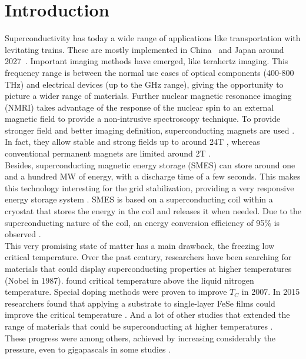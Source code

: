 \documentclass[../main.tex]{subfile}
\begin{document}
\section{Introduction}

Superconductivity has today a wide range of applications like transportation with levitating trains. These are mostly implemented in China~\cite{Roque2024} and Japan around 2027~\cite{Nishijima2013}.
Important imaging methods have emerged, like terahertz imaging. This frequency range is between the normal use cases of 
optical components (400-800 THz) and electrical devices (up to the GHz range), giving the opportunity to picture a wider range of materials.
Further nuclear magnetic resonance imaging (NMRI) takes advantage of the response of the nuclear spin to an external 
magnetic field to provide a non-intrusive spectroscopy technique. To provide stronger field and better imaging definition, superconducting magnets are used \cite{Nakamura2015}. In fact, they
allow stable and strong fields up to around 24T \cite{Hashi2015}, whereas conventional permanent magnets are limited around 2T \cite{Haishi2005}.\\
Besides, superconducting magnetic energy storage (SMES) can store around one and a hundred MW of energy, with a discharge time of a few seconds. This makes
this technology interesting for the grid stabilization, providing a very responsive energy storage system \cite{Tixador2008}.
SMES is based on a superconducting coil within a cryostat that stores the energy in the coil and releases it when needed. Due to the superconducting nature of the coil,
an energy conversion efficiency of 95\% is observed \cite{Tixador2008}.\\

This very promising state of matter has a main drawback, the freezing low critical temperature. Over the past century, researchers 
have been searching for materials that could display superconducting properties at higher temperatures \cite{Bednorz1986} (Nobel in 1987).
\cite{PhysRevLett.58.908} found critical temperature above the liquid nitrogen temperature.
Special doping methods were proven to improve $T_C$ \cite{Doiron-Leyraud2007} in 2007.
In 2015 researchers found that applying a substrate to single-layer FeSe films could improve the critical temperature \cite{Ge2015}.
And a lot of other studies that extended the range of materials that could be superconducting at higher temperatures \cite{Einaga2016}\cite{Drozdov_2019} \cite{lee2023}.\\
These progress were among others, achieved by increasing considerably the pressure, even to gigapascals in some studies \cite{Drozdov_2019}.\\
\end{document}
